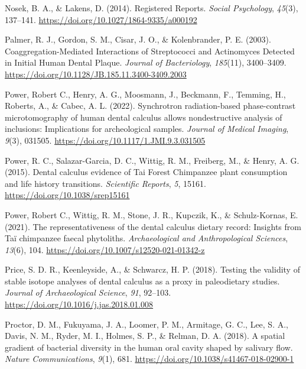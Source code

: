 \documentclass[
  b5paper,
]{book}
\newlength{\cslhangindent}
\newenvironment{CSLReferences}[2] %
 {\begin{list}{}{%
  \setlength{\itemindent}{0pt}
  \setlength{\leftmargin}{0pt}
  \setlength{\parsep}{0pt}
  \ifodd #1
   \setlength{\leftmargin}{\cslhangindent}
   \setlength{\itemindent}{-1\cslhangindent}
  \fi
  \setlength{\itemsep}{#2\baselineskip}}}
 {\end{list}}
\begin{document}
\begin{CSLReferences}{1}{0}
Nosek, B. A., \& Lakens, D. (2014). Registered {Reports}. \emph{Social
Psychology}, \emph{45}(3), 137--141.
\url{https://doi.org/10.1027/1864-9335/a000192}

Palmer, R. J., Gordon, S. M., Cisar, J. O., \& Kolenbrander, P. E.
(2003). Coaggregation-{Mediated Interactions} of {Streptococci} and
{Actinomyces Detected} in {Initial Human Dental Plaque}. \emph{Journal
of Bacteriology}, \emph{185}(11), 3400--3409.
\url{https://doi.org/10.1128/JB.185.11.3400-3409.2003}

Power, Robert C., Henry, A. G., Moosmann, J., Beckmann, F., Temming, H.,
Roberts, A., \& Cabec, A. L. (2022). Synchrotron radiation-based
phase-contrast microtomography of human dental calculus allows
nondestructive analysis of inclusions: Implications for archeological
samples. \emph{Journal of Medical Imaging}, \emph{9}(3), 031505.
\url{https://doi.org/10.1117/1.JMI.9.3.031505}

Power, R. C., Salazar-Garcia, D. C., Wittig, R. M., Freiberg, M., \&
Henry, A. G. (2015). Dental calculus evidence of {Tai Forest Chimpanzee}
plant consumption and life history transitions. \emph{Scientific
Reports}, \emph{5}, 15161. \url{https://doi.org/10.1038/srep15161}

Power, Robert C., Wittig, R. M., Stone, J. R., Kupczik, K., \&
Schulz-Kornas, E. (2021). The representativeness of the dental calculus
dietary record: Insights from {Taï} chimpanzee faecal phytoliths.
\emph{Archaeological and Anthropological Sciences}, \emph{13}(6), 104.
\url{https://doi.org/10.1007/s12520-021-01342-z}

Price, S. D. R., Keenleyside, A., \& Schwarcz, H. P. (2018). Testing the
validity of stable isotope analyses of dental calculus as a proxy in
paleodietary studies. \emph{Journal of Archaeological Science},
\emph{91}, 92--103. \url{https://doi.org/10.1016/j.jas.2018.01.008}

Proctor, D. M., Fukuyama, J. A., Loomer, P. M., Armitage, G. C., Lee, S.
A., Davis, N. M., Ryder, M. I., Holmes, S. P., \& Relman, D. A. (2018).
A spatial gradient of bacterial diversity in the human oral cavity
shaped by salivary flow. \emph{Nature Communications}, \emph{9}(1), 681.
\url{https://doi.org/10.1038/s41467-018-02900-1}


\end{CSLReferences}
\end{document}
